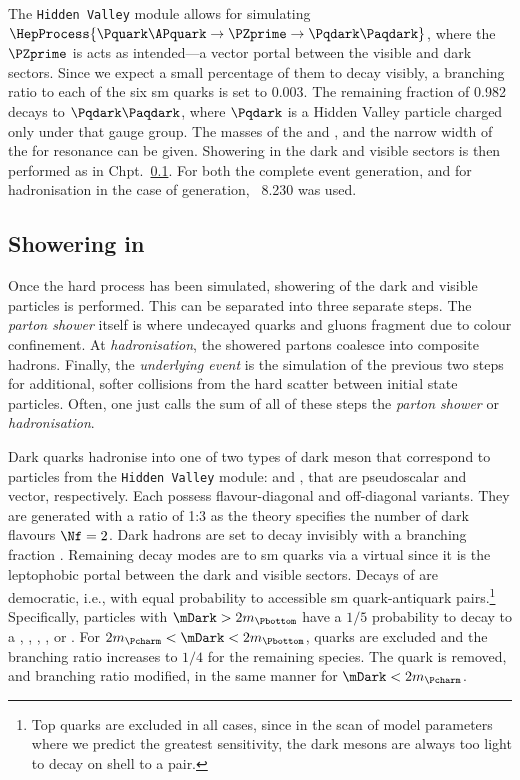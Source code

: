 The \texttt{Hidden Valley} module allows for simulating $\HepProcess{\Pquark\APquark \to \PZprime \to \Pqdark\Paqdark}$, where the $\PZprime$ is acts as intended---a vector portal between the visible and dark sectors. Since we expect a small percentage of them to decay visibly, a branching ratio to each of the six \acrshort{sm} quarks is set to 0.003. The remaining fraction of 0.982 decays to $\Pqdark\Paqdark$, where $\Pqdark$ is a Hidden Valley particle charged only under that gauge group. The masses of the \PZprime and \Pqdark, and the narrow width of the \PZprime for resonance can be given. Showering in the dark and visible sectors is then performed as in Chpt.~\ref{subsec:svj_showering_pythia}. For both the complete event generation, and for hadronisation in the case of \MADGRAPH generation, \PYTHIA~8.230 was used.




\subsection{Showering in \texorpdfstring{\PYTHIA}{Pythia}}
\label{subsec:svj_showering_pythia}

Once the hard process has been simulated, showering of the dark and visible particles is performed. This can be separated into three separate steps. The \emph{parton shower} itself is where undecayed quarks and gluons fragment due to colour confinement. At \emph{hadronisation}, the showered partons coalesce into composite hadrons. Finally, the \emph{underlying event} is the simulation of the previous two steps for additional, softer collisions from the hard scatter between initial state particles. Often, one just calls the sum of all of these steps the \emph{parton shower} or \emph{hadronisation}.

Dark quarks hadronise into one of two types of dark meson that correspond to particles from the \texttt{Hidden Valley} module: \Ppidark and \Prhodark, that are pseudoscalar and vector, respectively. Each possess flavour-diagonal and off-diagonal variants. They are generated with a ratio of 1:3 as the theory specifies the number of dark flavours $\Nf = \text{2}$. Dark hadrons are set to decay invisibly with a branching fraction \rinv. Remaining decay modes are to \acrshort{sm} quarks via a virtual \PZprime since it is the leptophobic portal between the dark and visible sectors. Decays of \Prhodark are democratic, i.e., with equal probability to accessible \acrshort{sm} quark-antiquark pairs.\footnote{Top quarks are excluded in all cases, since in the scan of model parameters where we predict the greatest sensitivity, the dark mesons are always too light to decay on shell to a \ttbar pair.} Specifically, \Prhodark particles with $\mDark > \text{2}m_{\Pbottom}$ have a $\text{1}/\text{5}$ probability to decay to a \Pup, \Pdown, \Pcharm, \Pstrange, or \Pbottom. For $2m_{\Pcharm} < \mDark < 2m_{\Pbottom}$, \Pbottom quarks are excluded and the branching ratio increases to $\text{1}/\text{4}$ for the remaining species. The \Pcharm quark is removed, and branching ratio modified, in the same manner for $\mDark < 2m_{\Pcharm}$.

